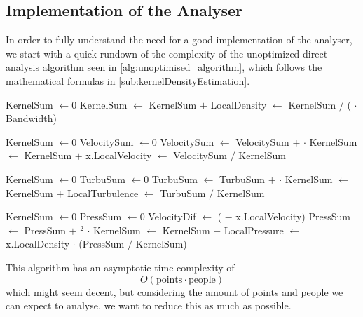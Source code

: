 \subsection{Implementation of the Analyser}\label{s3:analyser_implementation}

In order to fully understand the need for a good implementation of the analyser, we start with a quick rundown of the complexity of the unoptimized direct analysis algorithm seen in \cref{alg:unoptimised_algorithm}, which follows the mathematical formulas in \cref{sub:kernelDensityEstimation}.

\begin{center}
\label{alg:unoptimised_algorithm}
\begin{algorithmic}[1]

    \State KernelSum $\gets 0$
        \State KernelSum $\gets$ KernelSum $+$ 
    \EndFor
    \State LocalDensity $\gets$ KernelSum $/$ ( $\cdot$ Bandwidth)
\EndFor

    \State KernelSum $\gets 0$
    \State VelocitySum $\gets 0$
        \State VelocitySum $\gets$ VelocitySum $+$  $\cdot$ 
        \State KernelSum $\gets$ KernelSum $+$ 
    \EndFor
    \State x.LocalVelocity $\gets$ VelocitySum $/$ KernelSum
\EndFor

    \State KernelSum $\gets 0$
    \State TurbuSum $\gets 0$
        \State TurbuSum $\gets$ TurbuSum $+$  $\cdot$ 
        \State KernelSum $\gets$ KernelSum $+$ 
    \EndFor
    \State LocalTurbulence $\gets$ TurbuSum $/$ KernelSum
\EndFor

    \State KernelSum $\gets 0$
    \State PressSum $\gets 0$
        \State VelocityDif $\gets$ ( $-$ x.LocalVelocity)
        \State PressSum $\gets$ PressSum $+$ $^2$ $\cdot$ 
        \State KernelSum $\gets$ KernelSum $+$ 
    \EndFor
    \State LocalPressure $\gets$ x.LocalDensity $\cdot$ (PressSum $/$ KernelSum)
\EndFor
\EndFunction
\end{algorithmic}
\end{center}

This algorithm has an asymptotic time complexity of $$O(\text{points} \cdot \text{people})$$ which might seem decent, but considering the amount of points and people we can expect to analyse, we want to reduce this as much as possible.

